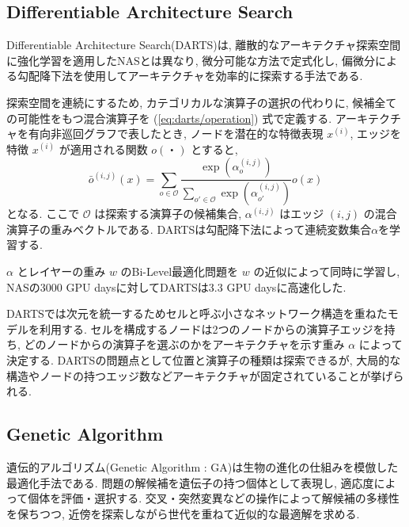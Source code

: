\documentclass[twocolumn]{jarticle}     %
\begin{document}
\subsection{Differentiable Architecture Search}
Differentiable Architecture Search(DARTS)\cite{DBLP:journals/corr/abs-1806-09055}は,
離散的なアーキテクチャ探索空間に強化学習を適用したNASとは異なり,
微分可能な方法で定式化し,
偏微分による勾配降下法を使用してアーキテクチャを効率的に探索する手法である.

探索空間を連続にするため, カテゴリカルな演算子の選択の代わりに, 候補全ての可能性をもつ混合演算子を
(\ref{eq:darts/operation}) 式で定義する.
アーキテクチャを有向非巡回グラフで表したとき, ノードを潜在的な特徴表現 $x^{(i)}$,
エッジを特徴 $x^{(i)}$ が適用される関数 $o(・)$ とすると,
\begin{equation}
  \label{eq:darts/operation}
  \bar{o}^{(i, j)}(x) = \sum_{o \in \mathcal{O}} \frac{\exp(\alpha^{(i, j)}_o)}{\sum_{o' \in \mathcal{O}} \exp(\alpha^{(i, j)}_{o'})} o(x)
\end{equation}
となる. ここで
$\mathcal{O}$ は探索する演算子の候補集合,
$\alpha^{(i, j)}$ はエッジ $(i, j)$ の混合演算子の重みベクトルである.
DARTSは勾配降下法によって連続変数集合$\alpha$を学習する.

$\alpha$ とレイヤーの重み $w$ のBi-Level最適化問題を $w$ の近似によって同時に学習し,
NASの3000 GPU daysに対してDARTSは3.3 GPU daysに高速化した.

DARTSでは次元を統一するためセルと呼ぶ小さなネットワーク構造を重ねたモデルを利用する.
セルを構成するノードは2つのノードからの演算子エッジを持ち,
どのノードからの演算子を選ぶのかをアーキテクチャを示す重み $\alpha$ によって決定する.
DARTSの問題点として位置と演算子の種類は探索できるが,
大局的な構造やノードの持つエッジ数などアーキテクチャが固定されていることが挙げられる.


\subsection{Genetic Algorithm}
遺伝的アルゴリズム(Genetic Algorithm : GA)は生物の進化の仕組みを模倣した最適化手法である.
問題の解候補を遺伝子の持つ個体として表現し, 適応度によって個体を評価・選択する.
交叉・突然変異などの操作によって解候補の多様性を保ちつつ,
近傍を探索しながら世代を重ねて近似的な最適解を求める.

\end{document}

